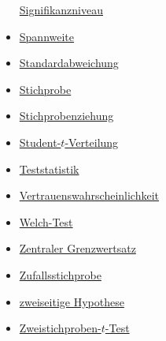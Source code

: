 \documentclass[
]{book}
\theoremstyle{definition}
\theoremstyle{definition}
\theoremstyle{definition}
\theoremstyle{definition}
\theoremstyle{remark}
\begin{document}
\begin{itemize}
  \hyperref[customdef-signifikanzniveau]{Signifikanzniveau}
\item
  \hyperref[customdef-spannweite]{Spannweite}
\item
  \hyperref[customdef-std]{Standardabweichung}
\item
  \hyperref[customdef-stichprobe]{Stichprobe}
\item
  \hyperref[customdef-stichprobenziehung]{Stichprobenziehung}
\item
  \hyperref[customdef-student-verteilung]{Student-\(t\)-Verteilung}
\item
  \hyperref[customdef-teststatistik]{Teststatistik}
\item
  \hyperref[customdef-confidence-level]{Vertrauenswahrscheinlichkeit}
\item
  \hyperref[customdef-welch-test]{Welch-Test}
\item
  \hyperref[customdef-zentraler-grenzwertsatz]{Zentraler Grenzwertsatz}
\item
  \hyperref[customdef-zufallsstichprobe]{Zufallsstichprobe}
\item
  \hyperref[customdef-zweiseitige-hypothese]{zweiseitige Hypothese}
\item
  \hyperref[customdef-twosample-t-test]{Zweistichproben-\(t\)-Test}
\end{itemize}

  
\end{document}
